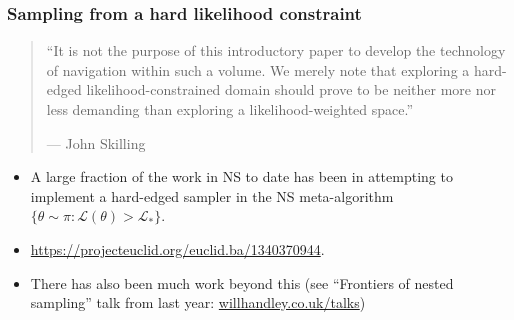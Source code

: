 \documentclass[aspectratio=169]{beamer}
\begin{document}
\begin{frame}
    \frametitle{Sampling from a hard likelihood constraint} 

    \begin{quote}
        ``It is not the purpose of this introductory paper to develop the technology of navigation within such a volume. We merely note that exploring a hard-edged likelihood-constrained domain should prove to be neither more nor less demanding than exploring a likelihood-weighted space.''

        {\hfill --- John Skilling}
    \end{quote}

    \begin{itemize}

        \item A large fraction of the work in NS to date has been in attempting to implement a hard-edged sampler in the NS meta-algorithm $\{\theta\sim \pi : \mathcal{L}(\theta)>\mathcal{L}_* \}$.
        \item \url{https://projecteuclid.org/euclid.ba/1340370944}.
        \item There has also been much work beyond this (see ``Frontiers of nested sampling'' talk from last year: \href{https://www.willhandley.co.uk/talks}{willhandley.co.uk/talks})
    \end{itemize}

\end{frame}
\end{document}
